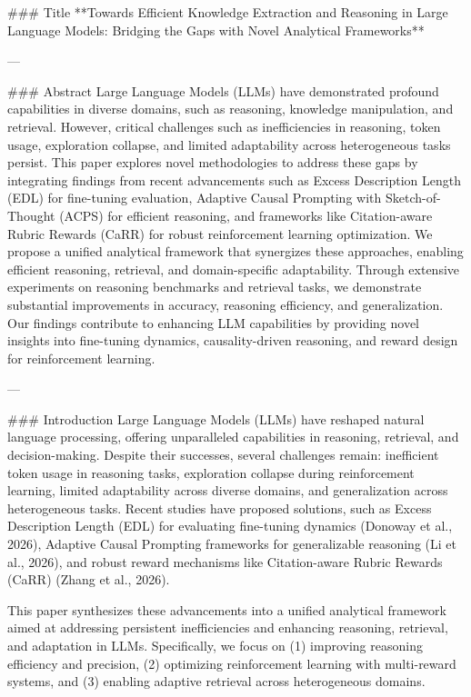 ### Title  
**Towards Efficient Knowledge Extraction and Reasoning in Large Language Models: Bridging the Gaps with Novel Analytical Frameworks**

---

### Abstract  
Large Language Models (LLMs) have demonstrated profound capabilities in diverse domains, such as reasoning, knowledge manipulation, and retrieval. However, critical challenges such as inefficiencies in reasoning, token usage, exploration collapse, and limited adaptability across heterogeneous tasks persist. This paper explores novel methodologies to address these gaps by integrating findings from recent advancements such as Excess Description Length (EDL) for fine-tuning evaluation, Adaptive Causal Prompting with Sketch-of-Thought (ACPS) for efficient reasoning, and frameworks like Citation-aware Rubric Rewards (CaRR) for robust reinforcement learning optimization. We propose a unified analytical framework that synergizes these approaches, enabling efficient reasoning, retrieval, and domain-specific adaptability. Through extensive experiments on reasoning benchmarks and retrieval tasks, we demonstrate substantial improvements in accuracy, reasoning efficiency, and generalization. Our findings contribute to enhancing LLM capabilities by providing novel insights into fine-tuning dynamics, causality-driven reasoning, and reward design for reinforcement learning.  

---

### Introduction  
Large Language Models (LLMs) have reshaped natural language processing, offering unparalleled capabilities in reasoning, retrieval, and decision-making. Despite their successes, several challenges remain: inefficient token usage in reasoning tasks, exploration collapse during reinforcement learning, limited adaptability across diverse domains, and generalization across heterogeneous tasks. Recent studies have proposed solutions, such as Excess Description Length (EDL) for evaluating fine-tuning dynamics (Donoway et al., 2026), Adaptive Causal Prompting frameworks for generalizable reasoning (Li et al., 2026), and robust reward mechanisms like Citation-aware Rubric Rewards (CaRR) (Zhang et al., 2026).  

This paper synthesizes these advancements into a unified analytical framework aimed at addressing persistent inefficiencies and enhancing reasoning, retrieval, and adaptation in LLMs. Specifically, we focus on (1) improving reasoning efficiency and precision, (2) optimizing reinforcement learning with multi-reward systems, and (3) enabling adaptive retrieval across heterogeneous domains.  

